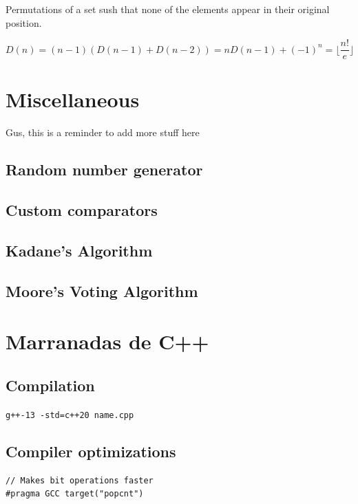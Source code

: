 \documentclass[10pt]{article}
\begin{document}
\begin{multicols*}{2}
Permutations of a set sush that none of the elements appear in their original position.

\[
D(n) = (n-1)(D(n-1)+D(n-2)) = nD(n-1)+(-1)^n = \lfloor \frac{n!}{e}\rfloor
\]

\section{Miscellaneous}

Gus, this is a reminder to add more stuff here

\subsection{Random number generator}


\subsection{Custom comparators}


\subsection{Kadane's Algorithm}


\subsection{Moore's Voting Algorithm}


\section{Marranadas de C++}

\subsection{Compilation}

\texttt{g++-13 -std=c++20 name.cpp}

\subsection{Compiler optimizations}


\begin{lstlisting}[style=compactcpp]
// Makes bit operations faster
#pragma GCC target("popcnt") 


\end{lstlisting}
\end{multicols*}
\end{document}
